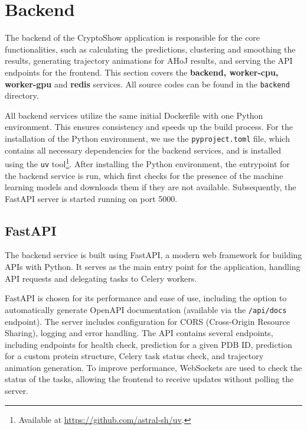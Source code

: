 \section{Backend}
\label{sec:backend}

The backend of the CryptoShow application is responsible for the core functionalities, such as calculating the predictions, clustering and smoothing the results, generating trajectory animations for AHoJ results, and serving the API endpoints for the frontend. This section covers the \textbf{backend, worker-cpu, worker-gpu} and \textbf{redis} services. All source codes can be found in the \lstinline!backend! directory.

All backend services utilize the same initial Dockerfile with one Python environment. This ensures consistency and speeds up the build process. For the installation of the Python environment, we use the \lstinline!pyproject.toml! file, which contains all necessary dependencies for the backend services, and is installed using the \lstinline|uv| tool\footnote{Available at \url{https://github.com/astral-sh/uv}.}. After installing the Python environment, the entrypoint for the backend service is run, which first checks for the presence of the machine learning models and downloads them if they are not available. Subsequently, the FastAPI server is started running on port 5000.

\subsection{FastAPI}
\label{sec:fastapi}

The backend service is built using FastAPI, a modern web framework for building APIs with Python. It serves as the main entry point for the application, handling API requests and delegating tasks to Celery workers.

FastAPI is chosen for its performance and ease of use, including the option to automatically generate OpenAPI documentation (available via the \lstinline|/api/docs| endpoint). The server includes configuration for CORS (Cross-Origin Resource Sharing), logging and error handling. The API contains several endpoints, including endpoints for health check, prediction for a given PDB ID, prediction for a custom protein structure, Celery task status check, and trajectory animation generation. To improve performance, WebSockets are used to check the status of the tasks, allowing the frontend to receive updates without polling the server.

